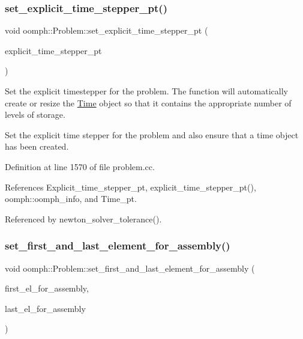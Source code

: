 \subsubsection{\texorpdfstring{set\+\_\+explicit\+\_\+time\+\_\+stepper\+\_\+pt()}{set\_explicit\_time\_stepper\_pt()}}
{\footnotesize\ttfamily void oomph\+::\+Problem\+::set\+\_\+explicit\+\_\+time\+\_\+stepper\+\_\+pt (\begin{DoxyParamCaption}\item[{\hyperlink{classoomph_1_1ExplicitTimeStepper}{Explicit\+Time\+Stepper} $\ast$const \&}]{explicit\+\_\+time\+\_\+stepper\+\_\+pt }\end{DoxyParamCaption})}



Set the explicit timestepper for the problem. The function will automatically create or resize the \hyperlink{classoomph_1_1Time}{Time} object so that it contains the appropriate number of levels of storage. 

Set the explicit time stepper for the problem and also ensure that a time object has been created. 

Definition at line 1570 of file problem.\+cc.



References Explicit\+\_\+time\+\_\+stepper\+\_\+pt, explicit\+\_\+time\+\_\+stepper\+\_\+pt(), oomph\+::oomph\+\_\+info, and Time\+\_\+pt.



Referenced by newton\+\_\+solver\+\_\+tolerance().

\mbox{\label{classoomph_1_1Problem_ac4dec80ab9a6834e10b2c2b0119e7133}} 
\subsubsection{\texorpdfstring{set\+\_\+first\+\_\+and\+\_\+last\+\_\+element\+\_\+for\+\_\+assembly()}{set\_first\_and\_last\_element\_for\_assembly()}}
{\footnotesize\ttfamily void oomph\+::\+Problem\+::set\+\_\+first\+\_\+and\+\_\+last\+\_\+element\+\_\+for\+\_\+assembly (\begin{DoxyParamCaption}\item[{\hyperlink{classoomph_1_1Vector}{Vector}$<$ unsigned $>$ \&}]{first\+\_\+el\+\_\+for\+\_\+assembly,  }\item[{\hyperlink{classoomph_1_1Vector}{Vector}$<$ unsigned $>$ \&}]{last\+\_\+el\+\_\+for\+\_\+assembly }\end{DoxyParamCaption})\hspace{0.3cm}{\ttfamily [inline]}}



